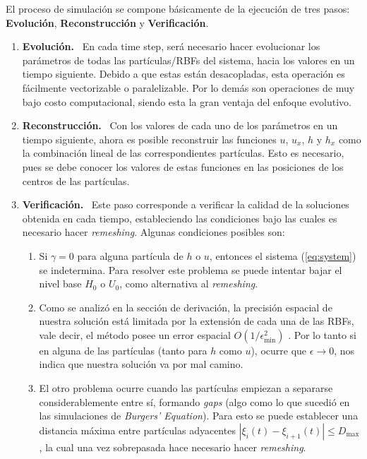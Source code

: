 \documentclass[spanish]{article}
\begin{document}
    El proceso de simulación se compone básicamente de la ejecución de tres pasos: \textbf{Evolución}, \textbf{Reconstrucción} y \textbf{Verificación}.

    \begin{enumerate}
        \item \textbf{Evolución.} \  En cada time step, será necesario hacer evolucionar los parámetros de todas las partículas/RBFs del sistema, hacia los valores en un tiempo siguiente. Debido a que estas están desacopladas, esta operación es fácilmente vectorizable o paralelizable. Por lo demás son operaciones de muy bajo costo computacional, siendo esta la gran ventaja del enfoque evolutivo.
        \item \textbf{Reconstrucción.} \ Con los valores de cada uno de los parámetros en un tiempo siguiente, ahora es posible reconstruir las funciones $u$, $u_x$, $h$ y $h_x$ como la combinación lineal de las correspondientes partículas. Esto es necesario, pues se debe conocer los valores de estas funciones en las posiciones de los centros de las partículas.
        \item \textbf{Verificación.} \ Este paso corresponde a verificar la calidad de la soluciones obtenida en cada tiempo, estableciendo las condiciones bajo las cuales es necesario hacer \textit{remeshing}. Algunas condiciones posibles son:

        \begin{enumerate}
            \item Si $\gamma=0$ para alguna partícula de $h$ o $u$, entonces el sistema (\ref{eq:system}) se indetermina. Para resolver este problema se puede intentar bajar el nivel base $H_0$ o $U_0$, como alternativa al \textit{remeshing}.
            \item Como se analizó en la sección de derivación, la precisión espacial de nuestra solución está limitada por la extensión de cada una de las RBFs, vale decir, el método posee un error espacial $\displaystyle O(1 / \epsilon_{\text{min}}^2)$ \footnotemark[1]. Por lo tanto si en alguna de las partículas (tanto para $h$ como $u$), ocurre que $\epsilon \rightarrow 0$, nos indica que nuestra solución va por mal camino.
            \item El otro problema ocurre cuando las partículas empiezan a separarse considerablemente entre sí, formando \textit{gaps} (algo como lo que sucedió en las simulaciones de \textit{Burgers' Equation}). Para esto se puede establecer una distancia máxima entre partículas adyacentes $|\xi_i(t)-\xi_{i+1}(t)| \leq D_{\text{max}}$, la cual una vez sobrepasada hace necesario hacer \textit{remeshing}.
        \end{enumerate}
    \end{enumerate}
\end{document}
